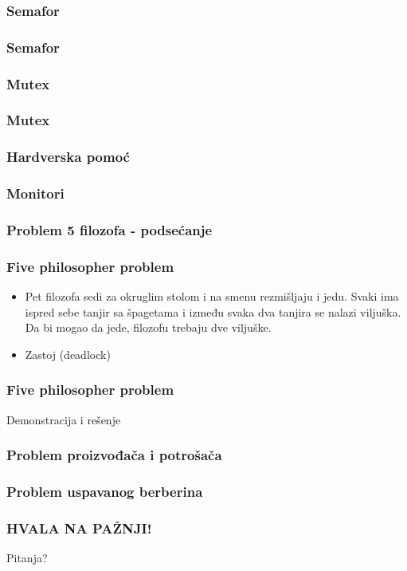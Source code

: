 \documentclass{beamer}
\begin{document}
\begin{frame}
    \frametitle{Semafor}
\end{frame}

\begin{frame}
    \frametitle{Semafor}

\end{frame}

\begin{frame}
    \frametitle{Mutex}
\end{frame}

\begin{frame}
    \frametitle{Mutex}
\end{frame}

\begin{frame}
    \frametitle{Hardverska pomoć}
\end{frame}

\begin{frame}
    \frametitle{Monitori}

\end{frame}

\begin{frame}
    \frametitle{Problem 5 filozofa - podsećanje}

\end{frame}



\begin{frame}
    \frametitle{Five philosopher problem}
    \begin{itemize}
        \item Pet filozofa sedi za okruglim stolom i na smenu rezmišljaju i jedu. 
        Svaki ima ispred sebe tanjir sa špagetama i između svaka dva tanjira se nalazi viljuška.
         Da bi mogao da jede, filozofu trebaju dve viljuške. \newline
        \item Zastoj (deadlock)
    \end{itemize}
\end{frame}

\begin{frame}
    \frametitle{Five philosopher problem}
    \begin{center}
        \large{Demonstracija i rešenje}
    \end{center}
\end{frame}

\begin{frame}
    \frametitle{Problem proizvođača i potrošača}
    

\end{frame}


\begin{frame}
    \frametitle{Problem uspavanog berberina}

    

\end{frame}

\begin{frame}
    \frametitle{HVALA NA PAŽNJI!}
    \begin{center}
        \Huge Pitanja?    
    \end{center}
\end{frame}
\end{document}
